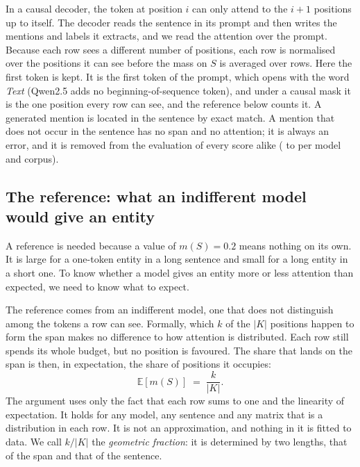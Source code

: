 \documentclass[11pt,a4paper]{article}
\begin{document}
In a causal decoder, the token at position $i$ can only attend to the $i+1$ positions up to itself.
The decoder reads the sentence in its prompt and then writes the mentions and labels it extracts, and we read the attention
over the prompt. Because each row sees a different number of positions, each row is normalised over the positions it can see
before the mass on $S$ is averaged over rows. Here the first token is kept. It is the first token of the prompt, which opens with the word
\emph{Text} (Qwen2.5 adds no beginning-of-sequence token), and under a causal mask it is the one position every
row can see, and the reference below counts it. A generated mention is located in the sentence by exact match. A mention that
does not occur in the sentence has no span and no attention; it is always an error, and it is removed from the evaluation of every score alike
(\decHallucMin{} to \decHallucMax{} per model and corpus).

\subsection{The reference: what an indifferent model would give an entity}
\label{sec:null}

A reference is needed because a value of $m(S)=0.2$ means nothing on its own. It is large for a one-token entity
in a long sentence and small for a long entity in a short one. To know whether a model gives an entity more or less attention
than expected, we need to know what to expect.

The reference comes from an indifferent model, one that does not distinguish among the tokens a row can see. Formally,
which $k$ of the $|K|$ positions happen to form the span makes no difference to how attention is distributed. Each row still
spends its whole budget, but no position is favoured. The share that lands on the span is then, in expectation, the share of
positions it occupies:
\begin{equation}
  \mathbb{E}[m(S)] \;=\; \frac{k}{|K|}.
  \label{eq:null}
\end{equation}
The argument uses only the fact that each row sums to one and the linearity of expectation. It holds for any model, any
sentence and any matrix that is a distribution in each row. It is not an approximation, and nothing in it is fitted to data. We
call $k/|K|$ the \emph{geometric fraction}: it is determined by two lengths, that of the span and that of the sentence.
\end{document}
